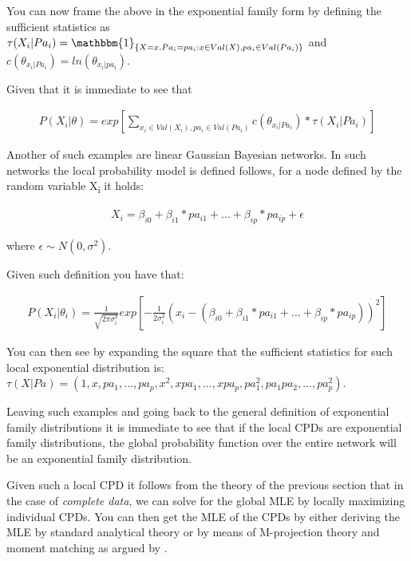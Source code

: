 \documentclass[11pt]{article}
\begin{document}
\begin{article}
You can now frame the above in the exponential family form by
defining the sufficient statistics as \(\tau(X_i | Pa_i) =
    \mathbbm{1}_{\{X = x, Pa_i = pa_i : x \in Val(X), pa_i \in
    Val(Pa_i)\}}\) and \(c(\theta_{x_i | Pa_i}) = ln(\theta_{x_i |
    pa_i})\).

Given that it is immediate to see that

\begin{align} \label{eq:multinomial-cpd}
P(X_i|\theta) = exp[\sum_{x_i \in Val(X_i), pa_i \in Val(Pa_i)} c(\theta_{x_i | Pa_i}) * \tau(X_i | Pa_i)] 
\end{align}

Another of such examples are linear Gaussian Bayesian networks. In
such networks the local probability model is defined follows, for
a node defined by the random variable X\textsubscript{i} it holds:

\begin{align} \label{eq:local-prob-model}
X_i = \beta_{i0} + \beta_{i1} * pa_{i1} + ... + \beta_{ip} * pa_{ip} + \epsilon
\end{align}

where \(\epsilon \sim N(0,\sigma^2)\).

Given such definition you have that:

\begin{align} \label{eq:gaussian-cpd}
P(X_i|\theta_i) = \frac{1}{\sqrt{2\pi\sigma_i^2}} exp[-\frac{1}{2\sigma_i^2} (x_i - (\beta_{i0} + \beta_{i1} * pa_{i1} + ... + \beta_{ip} * pa_{ip}))^2] 
\end{align}

You can then see by expanding the square that the sufficient
statistics for such local exponential distribution is: \(\tau(X|Pa) =
    (1,x,pa_1, ..., pa_p, x^2, xpa_1, . . . , xpa_p, pa_1^2, pa_1pa_2,
    . . . , pa_p^2)\).

Leaving such examples and going back to the general definition of
exponential family distributions it is immediate to see that if
the local CPDs are exponential family distributions, the global
probability function over the entire network will be an
exponential family distribution.

Given such a local CPD it follows from the theory of the previous
section that in the case of \emph{complete data}, we can solve for the
global MLE by locally maximizing individual CPDs. You can then get
the MLE of the CPDs by either deriving the MLE by standard
analytical theory or by means of M-projection theory and moment
matching as argued by \cite{koller2009probabilistic}.


\end{article}
\end{document}
